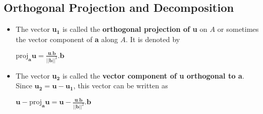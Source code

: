 \documentclass[a4paper,12pt]{article}
\begin{document}
\subsection*{Orthogonal Projection and Decomposition}
\begin{itemize}
  \item The vector \textbf{u\(_\textbf{1}\)} is called the \textbf{orthogonal projection of u} on \(A\) or sometimes the vector component of \textbf{a} along \(A\). It is denoted by \begin{center}
          \(\text{proj}_\textbf{a}\textbf{u} = \frac{\textbf{u}.\textbf{b}}{||\textbf{b}||^2}.\textbf{b}\)
        \end{center}
  \item The vector \textbf{u\(_\textbf{2}\)} is called the \textbf{vector component of u orthogonal to a}. Since \(\textbf{u}_\textbf{2}=\textbf{u}-\textbf{u}_\textbf{1}\), this vector can be written as \begin{center}
          \(\textbf{u}-\text{proj}_\textbf{a}\textbf{u} = \textbf{u}-\frac{\textbf{u}.\textbf{b}}{||\textbf{b}||^2}.\textbf{b}\)
        \end{center}
\end{itemize}
\end{document}
